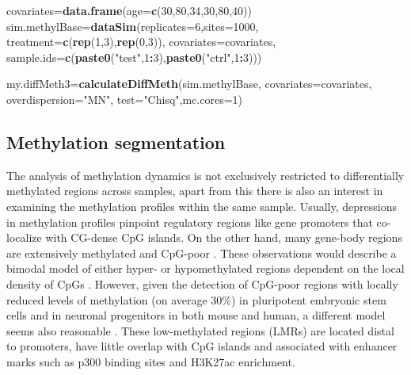\documentclass[12pt,]{krantz}
\newenvironment{Shaded}{\begin{snugshade}}{\end{snugshade}}
\newcommand{\DataTypeTok}[1]{\textcolor[rgb]{0.13,0.29,0.53}{#1}}
\newcommand{\DecValTok}[1]{\textcolor[rgb]{0.00,0.00,0.81}{#1}}
\newcommand{\KeywordTok}[1]{\textcolor[rgb]{0.13,0.29,0.53}{\textbf{#1}}}
\newcommand{\NormalTok}[1]{#1}
\newcommand{\OperatorTok}[1]{\textcolor[rgb]{0.81,0.36,0.00}{\textbf{#1}}}
\newcommand{\StringTok}[1]{\textcolor[rgb]{0.31,0.60,0.02}{#1}}
\begin{document}
\begin{Shaded}
\begin{Highlighting}[]
\NormalTok{covariates=}\KeywordTok{data.frame}\NormalTok{(}\DataTypeTok{age=}\KeywordTok{c}\NormalTok{(}\DecValTok{30}\NormalTok{,}\DecValTok{80}\NormalTok{,}\DecValTok{34}\NormalTok{,}\DecValTok{30}\NormalTok{,}\DecValTok{80}\NormalTok{,}\DecValTok{40}\NormalTok{))}
\NormalTok{sim.methylBase=}\KeywordTok{dataSim}\NormalTok{(}\DataTypeTok{replicates=}\DecValTok{6}\NormalTok{,}\DataTypeTok{sites=}\DecValTok{1000}\NormalTok{,}
                        \DataTypeTok{treatment=}\KeywordTok{c}\NormalTok{(}\KeywordTok{rep}\NormalTok{(}\DecValTok{1}\NormalTok{,}\DecValTok{3}\NormalTok{),}\KeywordTok{rep}\NormalTok{(}\DecValTok{0}\NormalTok{,}\DecValTok{3}\NormalTok{)),}
                        \DataTypeTok{covariates=}\NormalTok{covariates,}
                        \DataTypeTok{sample.ids=}\KeywordTok{c}\NormalTok{(}\KeywordTok{paste0}\NormalTok{(}\StringTok{"test"}\NormalTok{,}\DecValTok{1}\OperatorTok{:}\DecValTok{3}\NormalTok{),}\KeywordTok{paste0}\NormalTok{(}\StringTok{"ctrl"}\NormalTok{,}\DecValTok{1}\OperatorTok{:}\DecValTok{3}\NormalTok{)))}

\NormalTok{my.diffMeth3=}\KeywordTok{calculateDiffMeth}\NormalTok{(sim.methylBase,}
                               \DataTypeTok{covariates=}\NormalTok{covariates,}
                               \DataTypeTok{overdispersion=}\StringTok{"MN"}\NormalTok{,}
                               \DataTypeTok{test=}\StringTok{"Chisq"}\NormalTok{,}\DataTypeTok{mc.cores=}\DecValTok{1}\NormalTok{)}
\end{Highlighting}
\end{Shaded}

\hypertarget{methylation-segmentation}{%
\subsection{Methylation segmentation}\label{methylation-segmentation}}

The analysis of methylation dynamics is not exclusively restricted to differentially methylated regions across samples, apart from this there is also an interest in examining the methylation profiles within the same sample. Usually, depressions in methylation profiles pinpoint regulatory regions like gene promoters that co-localize with CG-dense CpG islands. On the other hand, many gene-body regions are extensively methylated and CpG-poor \citep{Bock2012-oh}. These observations would describe a bimodal model of either hyper- or hypomethylated regions dependent on the local density of CpGs \citep{Lovkvist2016-ky}. However, given the detection of CpG-poor regions with locally reduced levels of methylation (on average 30\%) in pluripotent embryonic stem cells and in neuronal progenitors in both mouse and human, a different model seems also reasonable \citep{Stadler2011-iu}. These low-methylated regions (LMRs) are located distal to promoters, have little overlap with CpG islands and associated with enhancer marks such as p300 binding sites and H3K27ac enrichment.
\end{document}
